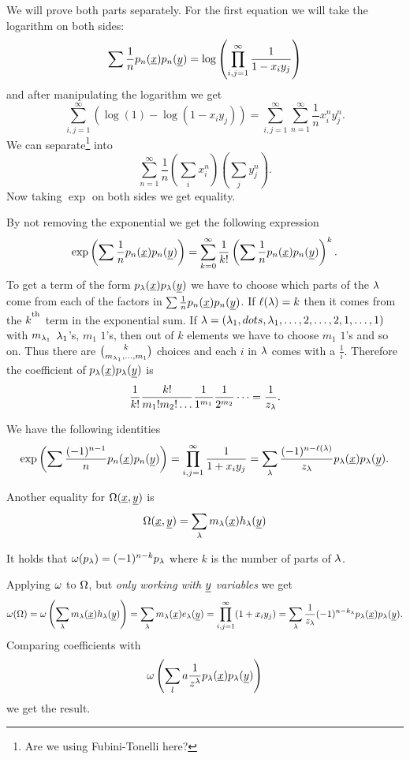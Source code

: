 \documentclass[12pt]{memoir}
\begin{document}
\begin{ptcbp}
    We will prove both parts separately. For the first equation we will take the logarithm on both sides: 
    $$\sum\frac{1}{n}p_n(\underline x)p_n(\underline y)=\log\left(\prod_{i,j=1}^\infty\frac{1}{1-x_iy_j}\right)$$
    and after manipulating the logarithm we get 
    $$\sum_{i,j=1}^\infty(\log(1)-\log(1-x_iy_j))=\sum_{i,j=1}^\infty\sum_{n=1}^\infty \frac{1}{n}x_i^ny_j^n.$$
    We can separate\footnote{Are we using Fubini-Tonelli here?} into 
    $$\sum_{n=1}^\infty\frac{1}{n}\left(\sum_i x_i^n\right)\left(\sum_j y_j^n\right).$$
    Now taking $\exp$ on both sides we get equality.\par 
    By not removing the exponential we get the following expression
    $$\exp\left(\sum\frac{1}{n}p_n(\underline x)p_n(\underline y)\right)=\sum_{k=0}^\infty\frac{1}{k!}\left(\sum\frac{1}{n}p_n(\underline x)p_n(\underline y)\right)^k.$$
    To get a term of the form $p_\lambda(\underline x)p_\lambda(\underline y)$ we have to choose which parts of the $\lambda$ come from each of the factors in $\sum\frac{1}{n}p_n(\underline x)p_n(\underline y)$. If $\ell(\lambda)=k$ then it comes from the $k^\textsuperscript{th}$ term in the exponential sum. If $\lambda=(\lambda_1,dots,\lambda_1,\dots,2,\dots,2,1,\dots,1)$ with $m_{\lambda_1}$ $\lambda_1$'s, $m_1$ $1$'s, then out of $k$ elements we have to choose $m_1$ $1$'s and so on. Thus there are $\binom{k}{m_{\lambda_1},\dots,m_1}$ choices and each $i$ in $\lambda$ comes with a $\frac{1}{i}$. Therefore the coefficient of $p_\lambda(\underline x)p_\lambda(\underline y)$ is 
    $$\frac{1}{k!}\frac{k!}{m_1!m_2!\dots}\frac{1}{1^{m_1}}\frac{1}{2^{m_2}}\dots=\frac{1}{z_\lambda}.$$
\end{ptcbp}

\begin{Lem}
    We have the following identities 
    $$\exp\left(\sum\frac{(-1)^{n-1}}{n}p_n(\underline x)p_n(\underline y)\right)=\prod_{i,j=1}^\infty\frac{1}{1+x_iy_j}=\sum_\lambda\frac{(-1)^{n-\ell(\lambda)}}{z_\lambda}p_\lambda(\underline x)p_\lambda(\underline y).$$
\end{Lem}

\begin{Lem}\label{lem:james1}
    Another equality for $\Omega(\underline x,\underline y)$ is 
    $$\Omega(\underline x,\underline y)=\sum_\lambda m_\lambda(\underline x)h_\lambda(\underline y)$$
\end{Lem}

\begin{Th}
    It holds that $\omega(p_\lambda)=(-1)^{n-k}p_\lambda$ where $k$ is the number of parts of $\lambda$.
\end{Th}

\begin{ptcbp}
    Applying $\omega$ to $\Omega$, but \emph{only working with $\underline y$ variables} we get 
    $$\omega(\Omega)=\omega\left(\sum_\lambda m_\lambda(\underline x)h_\lambda(\underline y)\right)=\sum_\lambda m_\lambda(\underline x)e_\lambda(\underline y)=\prod_{i,j=1}^\infty (1+x_iy_j)=\sum_{\lambda}\frac{1}{z_\lambda}(-1)^{n-k_\lambda}p_\lambda(\underline x)p_\lambda(\underline y).$$
    Comparing coefficients with 
    $$\omega\left(\sum_la\frac{1}{z^\lambda}p_\lambda(\underline x)p_\lambda(\underline y)\right)$$
    we get the result.
\end{ptcbp}
\end{document}

